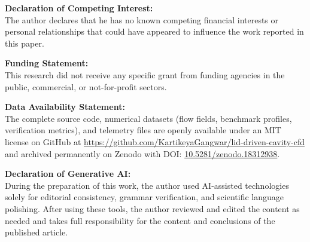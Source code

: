 \documentclass[11pt]{article}
\begin{document}
\vspace{1em}

\noindent\textbf{Declaration of Competing Interest:} \\
The author declares that he has no known competing financial interests or personal relationships that could have appeared to influence the work reported in this paper.

\vspace{1em}

\noindent\textbf{Funding Statement:} \\
This research did not receive any specific grant from funding agencies in the public, commercial, or not-for-profit sectors.

\vspace{1em}

\noindent\textbf{Data Availability Statement:} \\
The complete source code, numerical datasets (flow fields, benchmark profiles, verification metrics), and telemetry files are openly available under an MIT license on GitHub at \url{https://github.com/KartikeyaGangwar/lid-driven-cavity-cfd} and archived permanently on Zenodo with DOI: \href{https://doi.org/10.5281/zenodo.18312938}{10.5281/zenodo.18312938}.

\vspace{1em}

\noindent\textbf{Declaration of Generative AI:} \\
During the preparation of this work, the author used AI-assisted technologies solely for editorial consistency, grammar verification, and scientific language polishing. After using these tools, the author reviewed and edited the content as needed and takes full responsibility for the content and conclusions of the published article.
\end{document}
